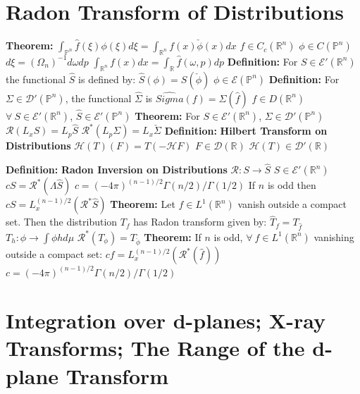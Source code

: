 \documentclass[14pt]{extarticle}
\def\Definition{{\color{blue} \textbf{Definition:} }}
\def\Theorem{{\color{red} \textbf{Theorem:} }}
\begin{document}
\begin{outline}
	\section*{Radon Transform of Distributions}
		\1	\Theorem $\int_{\mathbb{P}^n}\hat{f}(\xi)\phi(\xi) d\xi =
				\int_{\mathbb{R}^n} f(x) \check{\phi}(x) dx$
			\2	$f \in C_c(\mathbb{R}^n)$
			\2	$\phi \in C(\mathbb{P}^n)$
			\2	$d\xi = (\Omega_n)^{-1} d\omega dp$ 
			\2	$\int_{\mathbb{R}^n} f(x) dx = \int_{\mathbb{R}} \hat{f}(\omega,p)dp$
		\1	\Definition For $S \in \mathcal{E}'(\mathbb{R}^n)$ the functional
				$\hat{S}$ is defined by:
			\2	$\hat{S}(\phi) = S(\check{\phi})$
				\3	$\phi \in \mathcal{E}(\mathbb{P}^n)$
		\1 \Definition 	For $\Sigma \in \mathcal{D}'(\mathbb{P}^n)$, the functional
				$\hat{\Sigma}$ is
			\2	$\hat{Sigma}(f) = \Sigma(\hat{f})$
				\3	$f \in D(\mathbb{R}^n)$
			\2	$\forall~S \in \mathcal{E}'(\mathbb{R}^n)$, $\hat{S} \in \mathcal{E}'(\mathbb{P}^n)$
		\1	\Theorem For $S \in \mathcal{E}'(\mathbb{R}^n)$, $\Sigma \in \mathcal{D}'(\mathbb{P}^n)$
			\2	$\mathcal{R}(L_xS) = L_p \hat{S}$
			\2	$\mathcal{R}^*(L_p\Sigma) = L_x \check{\Sigma}$
		\1	\Definition \textbf{Hilbert Transform on Distributions}
			\2	$\mathcal{H}(T)(F) = T(-\mathcal{H}F)$
				\3	$F \in \mathcal{D}(\mathbb{R})$
				\3	$\mathcal{H}(T) \in \mathcal{D}'(\mathbb{R})$

		\1	\Definition \textbf{Radon Inversion on Distributions}
			\2	$\mathcal{R} : S \rightarrow \hat{S}$
				\3	$S \in \mathcal{E}'(\mathbb{R}^n)$
			\2	$cS = \mathcal{R}^*(\Lambda \hat{S})$
				\3	$c = (-4\pi)^{(n-1)/2}\Gamma(n/2)/\Gamma(1/2)$
			\2	If $n$ is odd then $cS = L_x^{(n-1)/2}(\mathcal{R}^* \hat{S})$
		\1	\Theorem Let $f \in L^1(\mathbb{R}^n)$ vanish outside a compact set.
				Then the distribution $T_f$ has Radon transform given by:
			\2	$\hat{T}_f = T_{\hat{f}}$
			\2	$T_h : \phi \rightarrow \int \phi h d\mu$
			\2	$\mathcal{R}^*(T_{\phi}) = T_{\check{\phi}}$
		\1	\Theorem If $n$ is odd, $\forall~f \in L^1(\mathbb{R}^n)$ vanishing outside
				a compact set:
			\2	$c f = L_x^{(n-1)/2}(\mathcal{R}^*(\hat{f}))$
				\3	$c = (-4\pi)^{(n-1)/2}\Gamma(n/2)/\Gamma(1/2)$
	
	\section*{Integration over d-planes; X-ray Transforms; The Range of the d-plane Transform}
	\end{outline}
\end{document}
